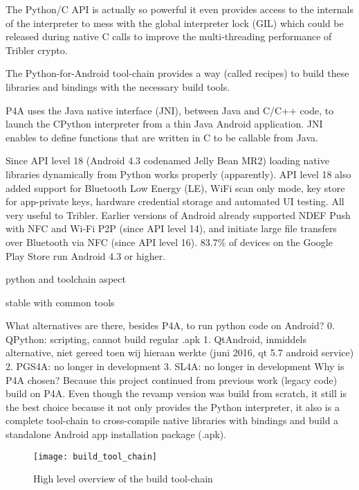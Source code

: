 The Python/C API is actually so powerful it even provides access to the internals of the interpreter to mess with the global interpreter lock (GIL) which could be released during native C calls to improve the multi-threading performance of Tribler crypto.

The Python-for-Android tool-chain provides a way (called recipes) to build these libraries and bindings with the necessary build tools.

P4A uses the Java native interface (JNI), between Java and C/C++ code, to launch the CPython interpreter from a thin Java Android application.
JNI enables to define functions that are written in C to be callable from Java.


Since API level 18 (Android 4.3 codenamed Jelly Bean MR2) loading native libraries dynamically from Python works properly (apparently).
API level 18 also added support for Bluetooth Low Energy (LE), WiFi scan only mode, key store for app-private keys, hardware credential storage and automated UI testing.
All very useful to Tribler.
Earlier versions of Android already supported NDEF Push with NFC and Wi-Fi P2P (since API level 14), and initiate large file transfers over Bluetooth via NFC (since API level 16).
83.7\% of devices on the Google Play Store run Android 4.3 or higher.


python and toolchain aspect

stable with common tools


What alternatives are there, besides P4A, to run python code on Android?
0. QPython: scripting, cannot build regular .apk
1. QtAndroid, inmiddels alternative, niet gereed toen wij hieraan werkte (juni 2016, qt 5.7 android service)
2. PGS4A: no longer in development
3. SL4A: no longer in development
Why is P4A chosen?
Because this project continued from previous work (legacy code) build on P4A.
Even though the revamp version was build from scratch, it still is the best choice because it not only provides the Python interpreter, it also is a complete tool-chain to cross-compile native libraries with bindings and build a standalone Android app installation package (.apk).


\begin{figure}
	\centering
	\texttt{[image: build\_tool\_chain]}
	\caption{High level overview of the build tool-chain}
	\label{fig:build_tool_chain}
\end{figure}



